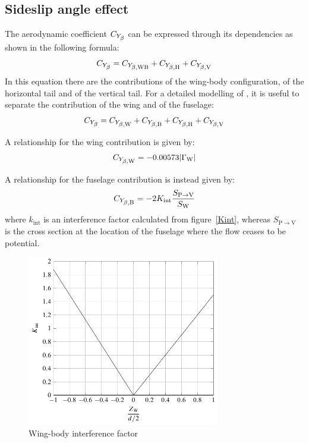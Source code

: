 \subsection{Sideslip angle effect}
\label{subsec2.1.1}

The aerodynamic coefficient $\CYbeta$ can be expressed through its dependencies as shown in the following formula:
\begin{equation}
\label{eq:sideslipeffect1}
\CYbeta =  \CYbetaWB + \CYbetaH + \CYbetaV
\end{equation}
In this equation there are the contributions of the wing-body configuration, of the horizontal tail and of the vertical tail. For a detailed modelling of \CYbeta, it is useful to separate the contribution of the wing and of the fuselage:
\begin{equation}
\label{eq:sideslipeffect2}
\CYbeta =  \CYbetaW + \CYbetaB + \CYbetaH + \CYbetaV
\end{equation}

A relationship for the wing contribution is given by:
\begin{equation}
\label{eq:sideslipW}
\CYbetaW = -0.00573 \abs \GammaW
\end{equation}

A relationship for the fuselage contribution is instead given by:
\begin{equation}
\label{eq:sideslipB}
\CYbetaB = -2 K_{\mathrm{int}} \frac{S_{\mathrm P \rightarrow \mathrm V}}{\SW}
\end{equation}
where $k_{\mathrm{int}}$ is an interference factor calculated from figure~\vref{Kint}, whereas $S_{\mathrm P \rightarrow \mathrm V}$ is the cross section at the location of the fuselage where the flow ceases to be potential.

\begin{figure}[htbp] 
\centering
\includegraphics[width=0.75\textwidth]{Immagini/Capitolo2/4_8-Kint}
\caption[Wing-body interference factor] {Wing-body interference factor}
\label{Kint}
\end{figure}

